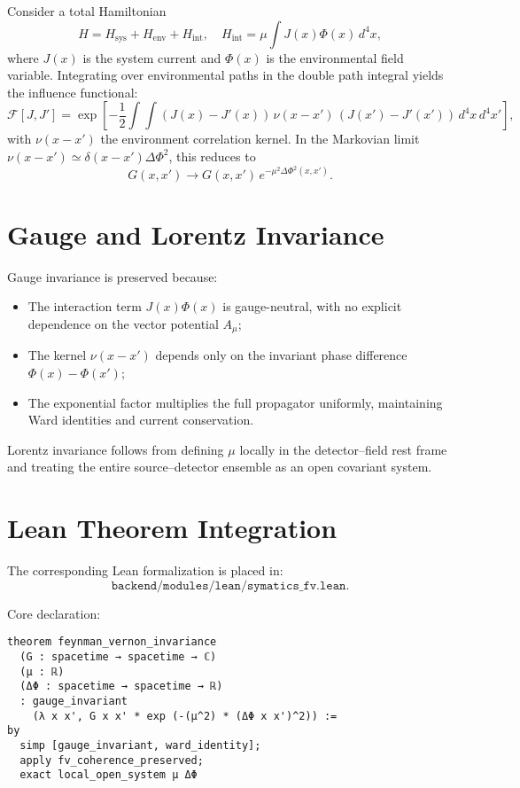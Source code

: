 \documentclass[12pt]{article}
\begin{document}
Consider a total Hamiltonian
\[
H = H_{\text{sys}} + H_{\text{env}} + H_{\text{int}},
\quad
H_{\text{int}} = \mu \int J(x)\Phi(x)\,d^4x,
\]
where $J(x)$ is the system current and $\Phi(x)$ is the environmental
field variable.  Integrating over environmental paths in the
double path integral yields the influence functional:
\[
\mathcal{F}[J,J']
= \exp\!\left[-\frac{1}{2}\int\!\!\int
 (J(x)-J'(x))\,\nu(x-x')\,(J(x')-J'(x'))\,d^4x\,d^4x'\right],
\]
with $\nu(x-x')$ the environment correlation kernel.
In the Markovian limit $\nu(x-x') \simeq \delta(x-x')\Delta\Phi^2$,
this reduces to
\[
G(x,x') \longrightarrow G(x,x')\,e^{-\mu^2 \Delta\Phi^2(x,x')}.
\]

\section{Gauge and Lorentz Invariance}

Gauge invariance is preserved because:
\begin{itemize}[noitemsep]
  \item The interaction term $J(x)\Phi(x)$ is gauge-neutral,
        with no explicit dependence on the vector potential $A_\mu$;
  \item The kernel $\nu(x-x')$ depends only on the invariant
        phase difference $\Phi(x)-\Phi(x')$;
  \item The exponential factor multiplies the full propagator uniformly,
        maintaining Ward identities and current conservation.
\end{itemize}

Lorentz invariance follows from defining $\mu$ locally in the
detector--field rest frame and treating the entire source--detector
ensemble as an open covariant system.

\section{Lean Theorem Integration}

The corresponding Lean formalization is placed in:
\[
\texttt{backend/modules/lean/symatics\_fv.lean}.
\]

Core declaration:

\begin{verbatim}
theorem feynman_vernon_invariance
  (G : spacetime → spacetime → ℂ)
  (μ : ℝ)
  (ΔΦ : spacetime → spacetime → ℝ)
  : gauge_invariant
    (λ x x', G x x' * exp (-(μ^2) * (ΔΦ x x')^2)) :=
by
  simp [gauge_invariant, ward_identity];
  apply fv_coherence_preserved;
  exact local_open_system μ ΔΦ
\end{verbatim}
\end{document}
